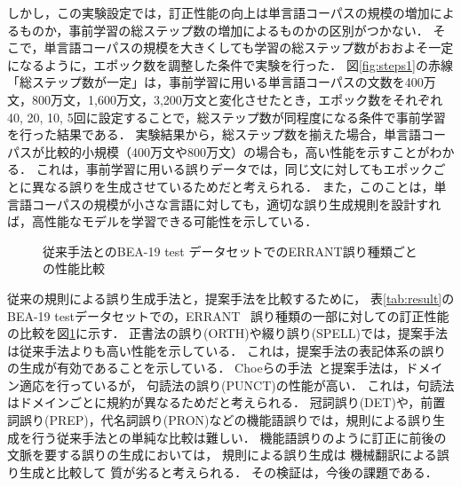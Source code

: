 \documentclass[
  platex, dvipdfmx %
]{nlp2021}
\begin{document}
しかし，この実験設定では，訂正性能の向上は単言語コーパスの規模の増加によるものか，事前学習の総ステップ数の増加によるものかの区別がつかない．
そこで，単言語コーパスの規模を大きくしても学習の総ステップ数がおおよそ一定になるように，エポック数を調整した条件で実験を行った．
図\ref{fig:steps1}の赤線「総ステップ数が一定」は，事前学習に用いる単言語コーパスの文数を400万文，800万文，1,600万文，3,200万文と変化させたとき，エポック数をそれぞれ40, 20, 10, 5回に設定することで，総ステップ数が同程度になる条件で事前学習を行った結果である．
実験結果から，総ステップ数を揃えた場合，単言語コーパスが比較的小規模（400万文や800万文）の場合も，高い性能を示すことがわかる．
これは，事前学習に用いる誤りデータでは，同じ文に対してもエポックごとに異なる誤りを生成させているためだと考えられる．
また，このことは，単言語コーパスの規模が小さな言語に対しても，適切な誤り生成規則を設計すれば，高性能なモデルを学習できる可能性を示している．

\begin{figure}[t]
	\centering
	\small
	\caption{従来手法とのBEA-19 test データセットでのERRANT誤り種類ごとの性能比較}
	\label{fig:confusion}
\end{figure}

従来の規則による誤り生成手法と，提案手法を比較するために，
表\ref{tab:result}のBEA-19 testデータセットでの，ERRANT~\cite{bryant-etal-2017-automatic} 誤り種類の一部に対しての訂正性能の比較を図\ref{fig:confusion}に示す．
正書法の誤り(ORTH)や綴り誤り(SPELL)では，提案手法は従来手法よりも高い性能を示している．
これは，提案手法の表記体系の誤りの生成が有効であることを示している．
Choeらの手法~\cite{choe-etal-2019-neural}と提案手法は，ドメイン適応を行っているが，
句読法の誤り(PUNCT)の性能が高い．
これは，句読法はドメインごとに規約が異なるためだと考えられる．
冠詞誤り(DET)や，前置詞誤り(PREP)，代名詞誤り(PRON)などの機能語誤りでは，規則による誤り生成を行う従来手法との単純な比較は難しい．
機能語誤りのように訂正に前後の文脈を要する誤りの生成においては，
規則による誤り生成は
機械翻訳による誤り生成と比較して
質が劣ると考えられる．
その検証は，今後の課題である．
\end{document}
